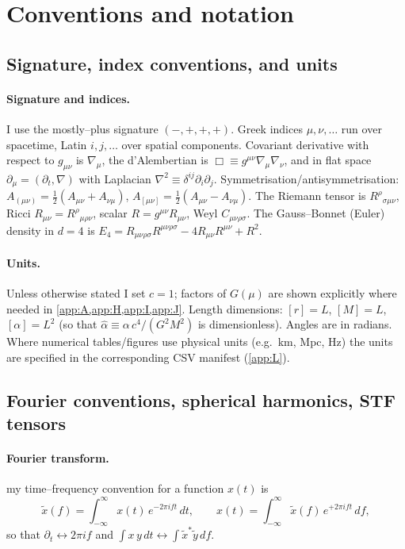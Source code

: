 \documentclass{iopjournal}
\begin{document}
\section{Conventions and notation}\label{app:M}

\subsection{Signature, index conventions, and units}\label{app:M1}
\paragraph{Signature and indices.}
I use the mostly–plus signature $(-,+,+,+)$. Greek indices $\mu,\nu,\dots$ run over spacetime, Latin $i,j,\dots$ over spatial components. Covariant derivative with respect to $g_{\mu\nu}$ is $\nabla_\mu$, the d'Alembertian is $\Box\equiv g^{\mu\nu}\nabla_\mu\nabla_\nu$, and in flat space $\partial_\mu=(\partial_t,\nabla)$ with Laplacian $\nabla^2\equiv \delta^{ij}\partial_i\partial_j$. Symmetrisation/antisymmetrisation: $A_{(\mu\nu)}=\tfrac12(A_{\mu\nu}+A_{\nu\mu})$, $A_{[\mu\nu]}=\tfrac12(A_{\mu\nu}-A_{\nu\mu})$. The Riemann tensor is $R^\rho{}_{\sigma\mu\nu}$, Ricci $R_{\mu\nu}=R^\rho{}_{\mu\rho\nu}$, scalar $R=g^{\mu\nu}R_{\mu\nu}$, Weyl $C_{\mu\nu\rho\sigma}$. The Gauss–Bonnet (Euler) density in $d=4$ is $E_4=R_{\mu\nu\rho\sigma}R^{\mu\nu\rho\sigma}-4R_{\mu\nu}R^{\mu\nu}+R^2$.

\paragraph{Units.}
Unless otherwise stated I set $c=1$; factors of $G(\mu)$ are shown explicitly where needed in \cref{app:A,app:H,app:I,app:J}. Length dimensions: $[r]=L$, $[M]=L$, $[\alpha]=L^{2}$ (so that $\widehat\alpha\equiv \alpha\,c^{4}/(G^{2}M^{2})$ is dimensionless). Angles are in radians. Where numerical tables/figures use physical units (e.g.\ km, Mpc, Hz) the units are specified in the corresponding CSV manifest (\cref{app:L}).

\subsection{Fourier conventions, spherical harmonics, STF tensors}\label{app:M2}
\paragraph{Fourier transform.}
my time–frequency convention for a function $x(t)$ is
\begin{equation}
\tilde x(f)=\int_{-\infty}^{\infty}x(t)\,e^{-2\pi i f t}\,dt,
\qquad
x(t)=\int_{-\infty}^{\infty}\tilde x(f)\,e^{+2\pi i f t}\,df,
\label{eq:M_fourier}
\end{equation}
so that $\partial_t\leftrightarrow 2\pi i f$ and $\int x\,y\,dt\leftrightarrow\int \tilde x^{\ast}\tilde y\,df$.
\end{document}
